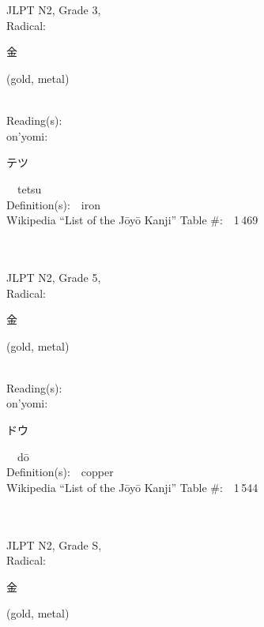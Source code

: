 \begin{multicols}{2}
\ \ \\
{\fontsize{34pt}{40pt}  }\ \ \\  %
{JLPT N2, Grade 3, \\Radical:\ \ {\begin{CJK}{UTF8}{min} 金 \end{CJK}} (gold, metal) } \\
Reading(s):\ \ \\
{\hspace*{1em}}on'yomi:\ \ \\
{\hspace*{2em}}{\begin{CJK}{UTF8}{min} テツ \end{CJK}}\ \ tetsu\ \ \\
Definition(s):\ \ iron \\
Wikipedia ``List of the J\=oy\=o Kanji'' Table \#:\ \ 1\,469 \\
\ \ \\
{\fontsize{34pt}{40pt}  }\ \ \\  %
{JLPT N2, Grade 5, \\Radical:\ \ {\begin{CJK}{UTF8}{min} 金 \end{CJK}} (gold, metal) } \\
Reading(s):\ \ \\
{\hspace*{1em}}on'yomi:\ \ \\
{\hspace*{2em}}{\begin{CJK}{UTF8}{min} ドウ \end{CJK}}\ \ d\=o\ \ \\
Definition(s):\ \ copper \\
Wikipedia ``List of the J\=oy\=o Kanji'' Table \#:\ \ 1\,544 \\
\ \ \\
{\fontsize{34pt}{40pt}  }\ \ \\  %
{JLPT N2, Grade S, \\Radical:\ \ {\begin{CJK}{UTF8}{min} 金 \end{CJK}} (gold, metal) } \\

\end{multicols}
